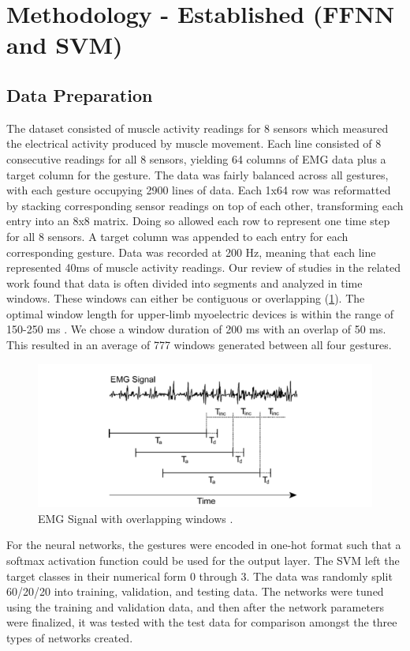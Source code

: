 \documentclass[journal]{IEEEtran}
\begin{document}
\section{Methodology - Established (FFNN and SVM)}
\label{sec:mat_met}

\subsection{Data Preparation}
\label{data_prep}
The dataset consisted of muscle activity readings for 8 sensors which measured the electrical activity produced by muscle movement. Each line consisted of 8 consecutive readings for all 8 sensors, yielding 64 columns of EMG data plus a target column for the gesture. The data was fairly balanced across all gestures, with each gesture occupying 2900 lines of data. Each 1x64 row was reformatted by stacking corresponding sensor readings on top of each other, transforming each entry into an 8x8 matrix. Doing so allowed each row to represent one time step for all 8 sensors. A target column was appended to each entry for each corresponding gesture. Data was recorded at 200 Hz, meaning that each line represented 40ms of muscle activity readings. Our review of studies in the related work found that data is often divided into segments and analyzed in time windows. These windows can either be contiguous or overlapping (\cref{fig:emg_overlap}). The optimal window length for upper-limb myoelectric devices is within the range of 150-250 ms \cite{englehart2003}. We chose a window duration of 200 ms with an overlap of 50 ms. This resulted in an average of 777 windows generated between all four gestures. 

\begin{figure}[b]
	\centering
	\includegraphics[width=0.92\linewidth]{EMG_Signal}
	\caption{EMG Signal with overlapping windows \cite{englehart2003}.}
	\label{fig:emg_overlap}
\end{figure}

For the neural networks, the gestures were encoded in one-hot format such that a softmax activation function could be used for the output layer. The SVM left the target classes in their numerical form 0 through 3. The data was randomly split 60/20/20 into training, validation, and testing data. The networks were tuned using the training and validation data, and then after the network parameters were finalized, it was tested with the test data for comparison amongst the three types of networks created. 
\end{document}
